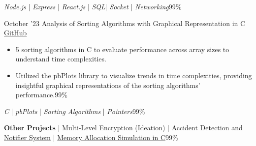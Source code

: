 \documentclass[9pt]{developercv} %
\begin{document}
\begin{entrylist}
{\begin{itemize}[noitemsep,topsep=0pt,parsep=0pt,partopsep=0pt, leftmargin=-1pt]
        \end{itemize} \vspace{2 pt}
        {\textit{Node.js}} | {\textit{Express}} | {\textit{React.js}} | {\textit{SQL}}| {\textit{Socket}} | {\textit{Networking}}{\color{white}99\%}}
    \entry
            {October '23}
		{Analysis of Sorting Algorithms with Graphical Representation in C}
		{\href{https://github.com/21Sandesh/Performance-Analysis-of-Sorting-Algorithms---Graphical-Representation}{GitHub}}
		{\vspace{-10pt}
        \begin{itemize}[noitemsep,topsep=0pt,parsep=0pt,partopsep=0pt, leftmargin=-1pt]
            \item {5 sorting algorithms in C to evaluate performance across array sizes to understand time complexities.}
            \item {Utilized the pbPlots library to visualize trends in time complexities, providing insightful graphical representations of the sorting algorithms' performance.{\color{white}99\%}}
        \end{itemize} \vspace{4 pt}
        {\textit{C}} | {\textit{pbPlots}} | {\textit{Sorting Algorithms}} | {\textit{Pointers}}{\color{white}99\%}}
    \entry
		{\textbf{Other Projects}}
		{ | {\href{https://github.com/21Sandesh/Multi-Level-Encryption-Ideation}{Multi-Level Encryption (Ideation)}} | {\href{https://github.com/21Sandesh/Accident-Detection-and-Notifier-System}{Accident Detection and Notifier System}}  | {\href{https://github.com/21Sandesh/OSCP}{Memory Allocation Simulation in C}}}{\color{white}99\%}
		{}
		{\vspace{-10pt}
        }
\end{entrylist}
\end{document}
